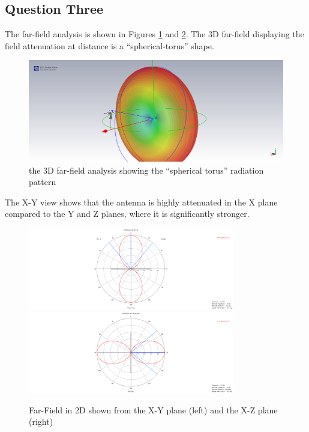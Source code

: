 \documentclass[colorlinks,11pt,a4paper,normalphoto,withhyper,ragged2e]{altareport}
\begin{document}
\newpage




\subsection{Question Three}

The far-field analysis is shown in Figures \ref{fig:hw_ff_3d} and \ref{fig:hw_ff_2d}. The 3D far-field displaying the field attenuation at distance is a ``spherical-torus'' shape. \linebreak

\begin{figure}[h]
	\centering
	\hspace{\fill}\includegraphics[width=14cm,valign=c]{Images/hw-farfield-plot-3d.png}\hspace{\fill}
	\caption{the 3D far-field analysis showing the ``spherical torus'' radiation pattern}  %
	\label{fig:hw_ff_3d}
\end{figure}

The X-Y view shows that the antenna is highly attenuated in the X plane compared to the Y and Z planes, where it is significantly stronger. \linebreak

\begin{figure}[h]
	\centering
	\hspace{\fill}\includegraphics[width=9cm,valign=c]{Images/hw-farfield-plot-xy-plane.png}\hspace{\fill}\includegraphics[width=9cm,valign=c]{Images/hw-farfield-plot-xz-plane.png}\hspace{\fill}
	\caption{Far-Field in 2D shown from the X-Y plane (left) and the X-Z plane (right)}  %
	\label{fig:hw_ff_2d}
\end{figure}
\end{document}

